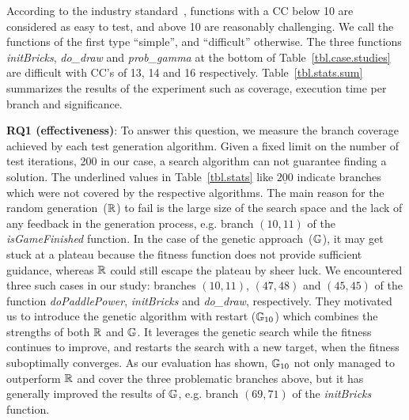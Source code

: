 According to the industry standard~\cite{bray1997c4}, functions with a CC below 10 are considered as easy to test, and above 10 are reasonably challenging. We call the functions of the first type ``simple'', and ``difficult'' otherwise. The three functions \mbox{\emph{initBricks}}, \emph{do_draw} and \emph{prob_gamma} at the bottom of Table~\ref{tbl.case.studies} are difficult with CC's of 13, 14 and 16 respectively. Table~\ref{tbl.stats.sum} summarizes the results of the experiment such as coverage, execution time per branch and significance.

\textbf{RQ1 (effectiveness)}: To answer this question, we measure the branch coverage achieved by each test generation algorithm. Given a fixed limit on the number of test iterations, 200 in our case, a search algorithm can not guarantee finding a solution. The underlined values in Table~\ref{tbl.stats} like $\underline{200}$ indicate branches which were not covered by the respective algorithms. The main reason for the random generation~($\mathbb{R}$) to fail is the large size of the search space and the lack of any feedback in the generation process, e.g. branch $(10,11)$ of the \emph{isGameFinished} function. In the case of the genetic approach~($\mathbb{G}$), it  may get stuck at a plateau because the fitness function does not provide sufficient guidance, whereas $\mathbb{R}$ could still escape the plateau by sheer luck. We encountered three such cases in our study: branches $(10,11)$, $(47,48)$ and $(45,45)$ of the function \emph{doPaddlePower}, \emph{initBricks} and \emph{do_draw}, respectively. They motivated us to introduce the genetic algorithm with restart ($\mathbb{G}_{10}$) which combines the strengths of both $\mathbb{R}$ and $\mathbb{G}$. It leverages the genetic search while the fitness continues to improve, and restarts the search with a new target, when the fitness suboptimally converges. As our evaluation has shown, $\mathbb{G}_{10}$ not only managed to outperform $\mathbb{R}$ and cover the three problematic branches above, but it has generally improved the results of $\mathbb{G}$, e.g. branch $(69,71)$ of the \emph{initBricks} function.\\

